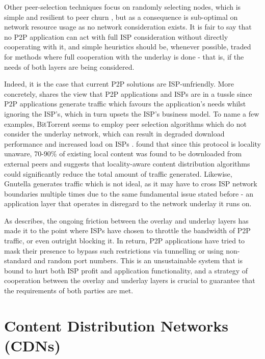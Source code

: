     Other peer-selection techniques focus on randomly selecting nodes, which is simple and resilient to peer churn \cite{qin2009}, but as a consequence is sub-optimal on network resource usage as no network consideration exists.
    It is fair to say that no P2P application can act with full ISP consideration without directly cooperating with it, and simple heuristics should be, whenever possible, traded for methods where full cooperation with the underlay is done - that is, if the needs of both layers are being considered.

    Indeed, it is the case that current P2P solutions are ISP-unfriendly.
    More concretely, \cite{isp-p2p-tussle} shares the view that P2P applications and ISPs are in a tussle since P2P applications generate traffic which favours the application's needs whilst ignoring the ISP's, which in turn upsets the ISP's business model.
    To name a few examples, BitTorrent seems to employ peer selection algorithms which do not consider the underlay network, which can result in degraded download performance and increased load on ISPs \cite{qin2009}.
    \cite{karagiannis} found that since this protocol is locality unaware, 70-90\% of existing local content was found to be downloaded from external peers and suggests that locality-aware content distribution algorithms could significantly reduce the total amount of traffic generated.
    Likewise, Gnutella generates traffic which is not ideal, as it may have to cross ISP network boundaries multiple times \cite{estimating-gnutella} due to the same fundamental issue stated before - an application layer that operates in disregard to the network underlay it runs on.

    As \cite{dan-Commag10} describes, the ongoing friction between the overlay and underlay layers has made it to the point where ISPs have chosen to throttle the bandwidth of P2P traffic, or even outright blocking it.
    In return, P2P applications have tried to mask their presence to bypass such restrictions via tunnelling or using non-standard and random port numbers.
    This is an unsustainable system that is bound to hurt both ISP profit and application functionality, and a strategy of cooperation between the overlay and underlay layers is crucial to guarantee that the requirements of both parties are met.


\section{Content Distribution Networks (CDNs)}

